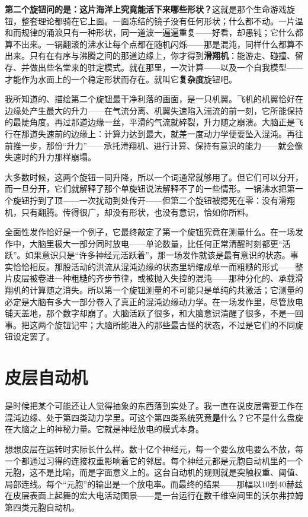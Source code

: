 \documentclass[11pt, twoside, openright]{book}
\begin{document}
\textbf{第二个旋钮问的是：这片海洋上究竟能活下来哪些形状？}这就是那个生命游戏旋钮，整套理论都骑在它上面。一面冻结的镜子没有任何形状；什么都不动。一片温和而规律的涌浪只有一种形状，同一道波一遍遍重复------好看，却愚钝；它什么都算不出来。一锅翻滚的沸水让每个点都在随机闪烁------那是混沌，同样什么都算不出来。只有在有序与沸腾之间的那道边缘上，你才得到\textbf{滑翔机}：能游走、碰撞、留存、并做出些名堂来的驻定模式。就在那里，一次计算------以及一个自我模型------才能作为水面上的一个稳定形状而存在。就叫它\textbf{复杂度}旋钮吧。

我所知道的、描绘第二个旋钮最干净利落的画面，是一只机翼。飞机的机翼恰好在边缘处产生最大的升力------在气流分离、机翼失速陷入湍流的前一刻，它所能保持的最陡角度。再过那道边缘一丝，平滑的气流就碎裂，升力随之崩溃。大脑正是飞行在那道失速前的边缘上：计算力达到最大，就差一度动力学便要坠入混沌。再往前推一步，那份“升力”------承托滑翔机、进行计算、保持有意识的能力------就会像失速时的升力那样崩塌。

大多数时候，这两个旋钮一同升降，所以一个词通常就够用了。但它们可以分开，而一旦分开，它们就解释了那个单旋钮说法解释不了的一些情形。一锅沸水把第一个旋钮拧到了顶------一次扰动到处传开------但第二个旋钮被摁死在零：没有滑翔机，只有翻腾。传得很广，却没有形状，也没有意识，恰如你所料。

全面性发作恰好是一个例子，它最终敲定了第一个旋钮究竟在测量什么。在一场发作中，大脑里极大一部分同时放电------单论数量，比任何正常清醒时刻都更“活跃”。如果意识只是“许多神经元活跃着”，那一场发作就该是最有意识的状态。事实恰恰相反。那股活动的洪流从混沌边缘的状态里坍缩成单一而粗糙的形式------整片皮层被卷进一种粗糙的齐步节律，或被抛入失控的混沌------那种分化的、承载滑翔机的计算随之消失。所以第一个旋钮测量的不可能只是单纯的共激活；它测量的必定是大脑有多大一部分卷入了真正的混沌边缘动力学。在一场发作里，尽管放电铺天盖地，那个数字却崩了。大脑活跃了很多，和大脑意识清醒了很多，不是一回事。把这两个旋钮记牢；大脑所能进入的那些最古怪的状态，不过是它们的不同旋钮设定罢了。

\section*{皮层自动机}

是时候把某个可能还让人觉得抽象的东西落到实处了。我一直在说皮层需要工作在混沌边缘、处于第四类动力学里。可这个第四类系统究竟\textbf{是}什么？它不是什么盘旋在大脑之上的神秘力量。它就是神经放电的模式本身。

想想皮层在运转时实际长什么样。数十亿个神经元，每一个要么放电要么不放，每一个都通过习得的连接权重影响着它的邻居。每个神经元都是元胞自动机里的一个元胞，这不是比喻，而是字面意义上的。这台自动机的规则就是突触权重、阈值、局部连线。每个“元胞”的输出是一个放电率。而最终的结果------那幅以10到40赫兹在皮层表面上起舞的宏大电活动图景------是一台运行在数千维空间里的沃尔弗拉姆第四类元胞自动机。
\end{document}
